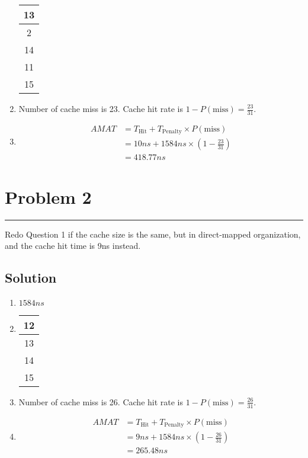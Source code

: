\documentclass{article}
\begin{document}
\begin{enumerate}[label=(\alph*)]
\begin{table}[h]
\begin{tabular}{|c|}
                  13 \\
                  \hline
                  2  \\
                  14 \\
                  \hline
                  11 \\
                  15 \\
                  \hline
              \end{tabular}
          \end{table}
    \item Number of cache miss is 23. Cache hit rate is $1-P(\text{miss}) = \frac{23}{31}$.
    \item \begin{align*}
              AMAT & = T_\text{Hit} + T_\text{Penalty} \times P(\text{miss}) \\
                   & = 10ns + 1584ns \times (1-\frac{23}{31})                \\
                   & = 418.77ns
          \end{align*}
\end{enumerate}

\section*{Problem 2}
\hrule
\vspace{0.5cm}

Redo Question 1 if the cache size is the same, but in direct-mapped organization,
and the cache hit time is 9ns instead.

\subsection*{Solution}

\begin{enumerate}[label=(\alph*)]
    \item $1584ns$
    \item \begin{tabular}{|c|}
              \hline
              12 \\
              \hline
              13 \\
              \hline
              14 \\
              \hline
              15 \\
              \hline
          \end{tabular}
    \item Number of cache miss is 26. Cache hit rate is $1-P(\text{miss}) = \frac{26}{31}$.
    \item \begin{align*}
              AMAT & = T_\text{Hit} + T_\text{Penalty} \times P(\text{miss}) \\
                   & = 9ns + 1584ns \times (1-\frac{26}{31})                 \\
                   & = 265.48ns                                              \\
          \end{align*}
\end{enumerate}
\end{document}
